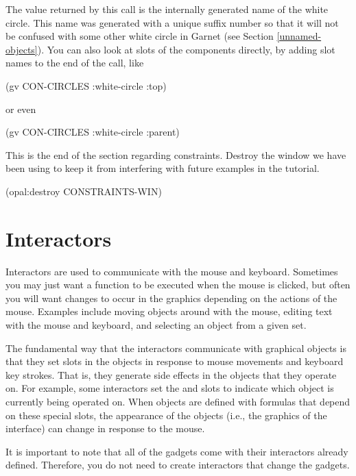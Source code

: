 The value returned by this  call is the internally
generated name of the white circle.  This name was generated with a
unique suffix number so that it will not be confused with some other
white circle in Garnet (see Section \ref{unnamed-objects}).  You can
also look at slots of the components directly, by adding slot names to
the end of the  call, like

\begin{programexample}
(gv CON-CIRCLES :white-circle :top)
\end{programexample}

or even

\begin{programexample}
(gv CON-CIRCLES :white-circle :parent)
\end{programexample}

This is the end of the section regarding constraints.  Destroy the window
we have been using to keep it from interfering with future examples in
the tutorial.

\begin{programexample}
(opal:destroy CONSTRAINTS-WIN)
\end{programexample}



\chapter{Interactors}
\label{interactors}

Interactors are used to communicate with the mouse and keyboard.
Sometimes you may just want a function to be executed when the mouse
is clicked, but often you will want changes to occur in the graphics
depending on the actions of the mouse.  Examples include moving
objects around with the mouse, editing text with the mouse and
keyboard, and selecting an object from a given set.

The fundamental way that the interactors communicate with graphical
objects is that they set slots in the objects in response to mouse
movements and keyboard key strokes.  That is, they generate side
effects in the objects that they operate on.  For example, some interactors
set the  and  slots to indicate which
object is currently being operated on.  When objects are defined with
formulas that depend on these special slots, the appearance of the
objects (i.e., the graphics of the interface) can change in response
to the mouse.

It is important to note that all of the gadgets come with their
interactors already defined.  Therefore, you do not need to create
interactors that change the gadgets.

